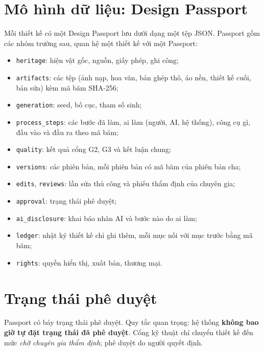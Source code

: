 \documentclass[12pt,a4paper]{report}
\begin{document}
\section{Mô hình dữ liệu: Design Passport}

Mỗi thiết kế có một Design Passport lưu dưới dạng một tệp JSON. Passport gồm các nhóm trường sau, quan hệ một thiết kế với một Passport:

\begin{itemize}
  \item \texttt{heritage}: hiện vật gốc, nguồn, giấy phép, ghi công;
  \item \texttt{artifacts}: các tệp (ảnh nạp, hoa văn, bản ghép thô, áo nền, thiết kế cuối, bản sửa) kèm mã băm SHA-256;
  \item \texttt{generation}: seed, bố cục, tham số sinh;
  \item \texttt{process\_steps}: các bước đã làm, ai làm (người, AI, hệ thống), công cụ gì, đầu vào và đầu ra theo mã băm;
  \item \texttt{quality}: kết quả cổng G2, G3 và kết luận chung;
  \item \texttt{versions}: các phiên bản, mỗi phiên bản có mã băm của phiên bản cha;
  \item \texttt{edits}, \texttt{reviews}: lần sửa thủ công và phiếu thẩm định của chuyên gia;
  \item \texttt{approval}: trạng thái phê duyệt;
  \item \texttt{ai\_disclosure}: khai báo nhãn AI và bước nào do ai làm;
  \item \texttt{ledger}: nhật ký thiết kế chỉ ghi thêm, mỗi mục nối với mục trước bằng mã băm;
  \item \texttt{rights}: quyền hiển thị, xuất bản, thương mại.
\end{itemize}


\section{Trạng thái phê duyệt}

Passport có bảy trạng thái phê duyệt. Quy tắc quan trọng: hệ thống \textbf{không bao giờ tự đặt trạng thái đã phê duyệt}. Cổng kỹ thuật chỉ chuyển thiết kế đến mức \emph{chờ chuyên gia thẩm định}; phê duyệt do người quyết định.
\end{document}
